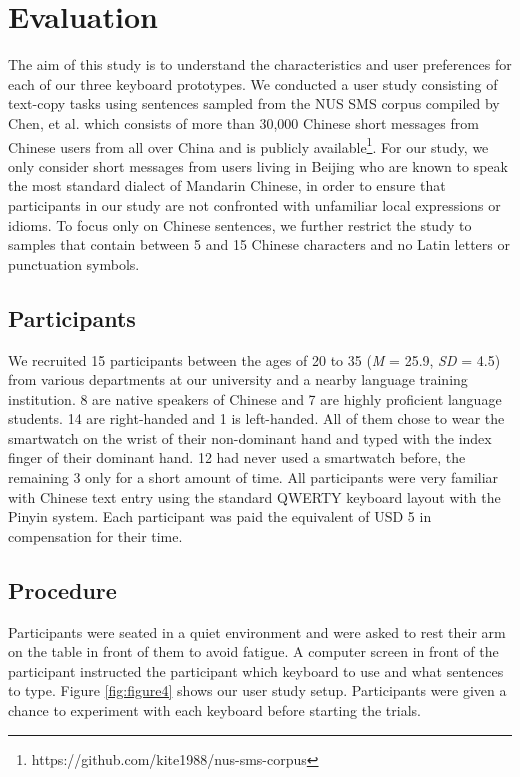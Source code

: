 \chapter{Evaluation}
\label{c:evaluation}


The aim of this study is to understand the characteristics and user preferences for each of our three keyboard prototypes. We conducted a user study consisting of text-copy tasks using sentences sampled from the NUS SMS corpus compiled by Chen, et al. \cite{Chen2013} which consists of more than 30,000 Chinese short messages from Chinese users from all over China and is publicly available\footnote{https://github.com/kite1988/nus-sms-corpus}.
For our study, we only consider short messages from users living in Beijing who are known to speak the most standard dialect of Mandarin Chinese, in order to ensure that participants in our study are not confronted with unfamiliar local expressions or idioms. To focus only on Chinese sentences, we further restrict the study to samples that contain between 5 and 15 Chinese characters and no Latin letters or punctuation symbols.




\section{Participants}
We recruited 15 participants between the ages of 20 to 35 (\textit{M} = 25.9, \textit{SD} = 4.5) from various departments at our university and a nearby language training institution. 8 are native speakers of Chinese and 7 are highly proficient language students. 14 are right-handed and 1 is left-handed. All of them chose to wear the smartwatch on the wrist of their non-dominant hand and typed with the index finger of their dominant hand. 12 had never used a smartwatch before, the remaining 3 only for a short amount of time. All participants were very familiar with Chinese text entry using the standard QWERTY keyboard layout with the Pinyin system. Each participant was paid the equivalent of USD 5 in compensation for their time.





\section{Procedure}
Participants were seated in a quiet environment and were asked to rest their arm on the table in front of them to avoid fatigue. A computer screen in front of the participant instructed the participant which keyboard to use and what sentences to type. Figure \ref{fig:figure4} shows our user study setup. Participants were given a chance to experiment with each keyboard before starting the trials.







